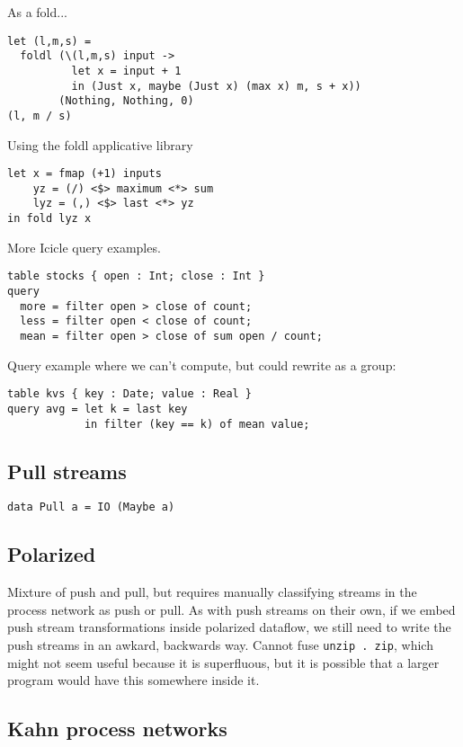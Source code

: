 As a fold...
\begin{lstlisting}
let (l,m,s) =
  foldl (\(l,m,s) input ->
          let x = input + 1
          in (Just x, maybe (Just x) (max x) m, s + x))
        (Nothing, Nothing, 0)
(l, m / s)
\end{lstlisting}

Using the foldl applicative library
\begin{lstlisting}
let x = fmap (+1) inputs
    yz = (/) <$> maximum <*> sum
    lyz = (,) <$> last <*> yz
in fold lyz x
\end{lstlisting}

More Icicle query examples.
\begin{lstlisting}
table stocks { open : Int; close : Int }
query
  more = filter open > close of count;
  less = filter open < close of count;
  mean = filter open > close of sum open / count;
\end{lstlisting}

Query example where we can't compute, but could rewrite as a group:
\begin{lstlisting}
table kvs { key : Date; value : Real }
query avg = let k = last key
            in filter (key == k) of mean value;
\end{lstlisting}


\subsection{Pull streams}

\begin{lstlisting}
data Pull a = IO (Maybe a)
\end{lstlisting}

\subsection{Polarized}
Mixture of push and pull, but requires manually classifying streams in the process network as push or pull.
As with push streams on their own, if we embed push stream transformations inside polarized dataflow, we still need to write the push streams in an awkard, backwards way.
Cannot fuse \lstinline/unzip . zip/, which might not seem useful because it is superfluous, but it is possible that a larger program would have this somewhere inside it.

\subsection{Kahn process networks}

